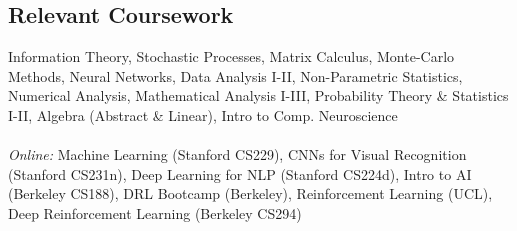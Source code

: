 \documentclass[margin,line]{res}
\begin{document}
\begin{resume}
\section{\sc Relevant Coursework}
Information Theory, Stochastic Processes, Matrix Calculus, Monte-Carlo Methods, Neural Networks, Data Analysis I-II, Non-Parametric Statistics, Numerical Analysis, Mathematical Analysis I-III, Probability Theory \& Statistics I-II, Algebra (Abstract \& Linear), Intro to Comp. Neuroscience
\vspace*{-.1in}
\\\\
{\it Online:} Machine Learning (Stanford CS229), CNNs for Visual Recognition (Stanford CS231n), Deep Learning for NLP (Stanford CS224d),
Intro to AI (Berkeley CS188), DRL Bootcamp (Berkeley), Reinforcement Learning (UCL), Deep Reinforcement Learning (Berkeley CS294)


\end{resume}
\end{document}
